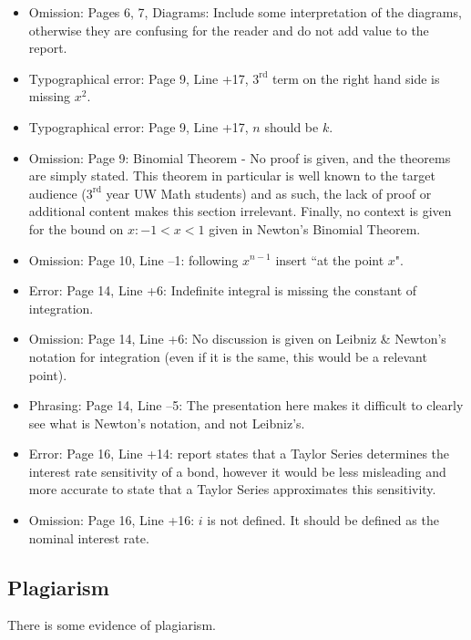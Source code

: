 \documentclass[11pt]{article}
\begin{document}
\begin{itemize}
\item Omission: Pages 6, 7, Diagrams: Include some interpretation of the diagrams, otherwise they are confusing for the reader and do not add value to the report.
\item Typographical error: Page 9, Line +17, $3^{\text{rd}}$ term on the right hand side is missing $x^2$.
\item Typographical error: Page 9, Line +17, $n$ should be $k$.
\item Omission: Page 9: Binomial Theorem - No proof is given, and the theorems are simply stated. This theorem in particular is well known to the target audience ($3^{\text{rd}}$ year UW Math students) and as such, the lack of proof or additional content makes this section irrelevant. Finally, no context is given for the bound on $x: -1 < x < 1$ given in Newton's Binomial Theorem.
\item Omission: Page 10, Line --1: following $x^{n-1}$ insert ``at the point $x$".
\item Error: Page 14, Line +6: Indefinite integral is missing the constant of integration.
\item Omission: Page 14, Line +6: No discussion is given on Leibniz \& Newton's notation for integration (even if it is the same, this would be a relevant point).
\item Phrasing: Page 14, Line --5: The presentation here makes it difficult to clearly see what is Newton's notation, and not Leibniz's. 
\item Error: Page 16, Line +14: report states that a Taylor Series determines the interest rate sensitivity of a bond, however it would be less misleading and more accurate to state that a Taylor Series approximates this sensitivity.
\item Omission: Page 16, Line +16: $i$ is not defined. It should be defined as the nominal interest rate.
\end{itemize}

\subsection*{Plagiarism}

There is some evidence of plagiarism.
\end{document}

